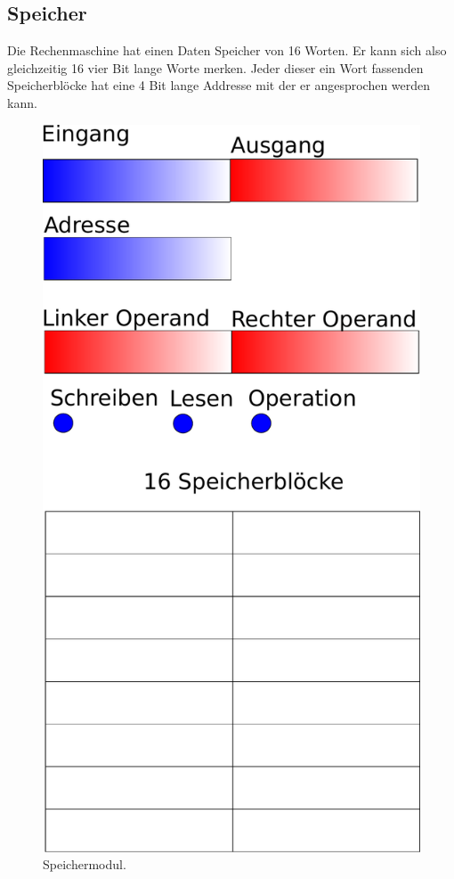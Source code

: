 \documentclass[11pt,a4paper,leqno]{report}
\numberwithin{equation}{chapter}
\begin{document}
\subsection{Speicher}
Die Rechenmaschine hat einen Daten Speicher von 16 Worten. Er kann sich also gleichzeitig 16 vier Bit lange Worte merken. Jeder dieser ein Wort fassenden Speicherbl\"ocke hat eine 4 Bit lange Addresse mit der er angesprochen werden kann.
\begin{figure}[H]
	\begin{center}
		\includegraphics[scale=0.3]{Bilder/Speicher.pdf}
		\caption{Speichermodul.}
	\end{center}
\end{figure}
\end{document}
